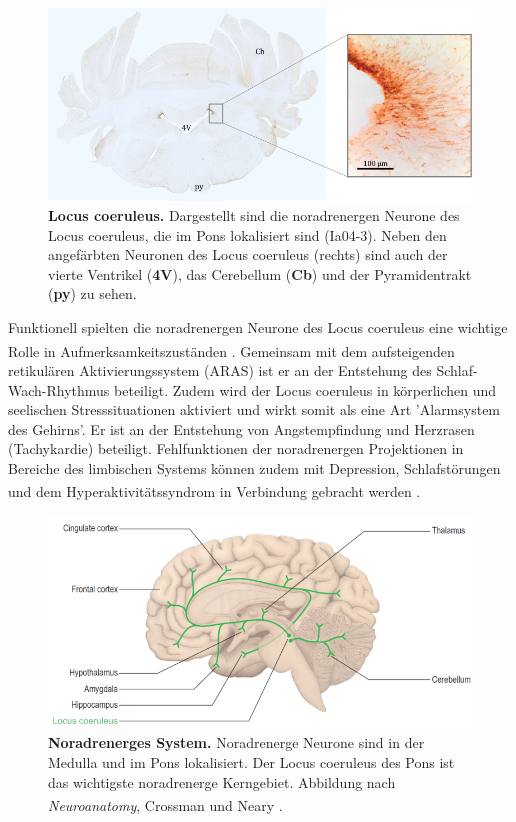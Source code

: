 \begin{figure}[H]
    \centering
    \includegraphics[width=\textwidth]{pictures/Bilder_monoamine_systeme/locus_coeruleus.png}
    \caption[Locus coeruleus]{\textbf{Locus coeruleus.} Dargestellt sind die noradrenergen Neurone des Locus coeruleus, die im Pons lokalisiert sind (Ia04-3). Neben den angefärbten Neuronen des Locus coeruleus (rechts) sind auch der vierte Ventrikel (\textbf{4V}), das Cerebellum (\textbf{Cb}) und der Pyramidentrakt (\textbf{py}) zu sehen.}
    \label{fig:locus_coeruleus}
\end{figure}

Funktionell spielten die noradrenergen Neurone des Locus coeruleus eine wichtige Rolle in Aufmerksamkeitszuständen \textsuperscript{\cite[Kap.~46]{kandel2013principles}}. Gemeinsam mit dem aufsteigenden retikulären Aktivierungssystem (ARAS) ist er an der Entstehung des Schlaf-Wach-Rhythmus beteiligt. Zudem wird der Locus coeruleus in körperlichen und seelischen Stresssituationen aktiviert und wirkt somit als eine Art 'Alarmsystem des Gehirns'. Er ist an der Entstehung von Angstempfindung und Herzrasen (Tachykardie) beteiligt. Fehlfunktionen der noradrenergen Projektionen in Bereiche des limbischen Systems können zudem mit Depression, Schlafstörungen und dem Hyperaktivitätssyndrom in Verbindung gebracht werden \textsuperscript{\cite[Kap.~6]{trepel2011neuroanatomie}}.

\begin{figure}[H]
    \centering
    \includegraphics[width=\textwidth]{pictures/Bilder_monoamine_systeme/noradrenerges_system.PNG}
    \caption[Noradrenerges System]{\textbf{Noradrenerges System.} Noradrenerge Neurone sind in der Medulla und im Pons lokalisiert. Der Locus coeruleus des Pons ist das wichtigste noradrenerge Kerngebiet. Abbildung nach \textit{Neuroanatomy}, Crossman und Neary \textsuperscript{\cite[Kap.~9]{crossman2014neuroanatomy}}.}
    \label{fig:noradrenerges_system}
\end{figure}{}

